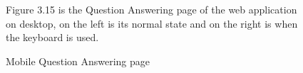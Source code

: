 \documentclass[12pt,oneside,openright,a4paper]{cpe-english-project}
\begin{document}
\begin{figure}[!h]
\begin{minipage}{.3\textwidth}
      \end{minipage}%
      \caption{Mobile Question Answering page}\label{fig:Mobile Question Answering page}
      \begin{flushleft}
        \qquad Figure 3.15 is the Question Answering page of the web application on desktop, on the left is its normal state and on the right is when the keyboard is used. \par
      \end{flushleft}
    \end{figure}
\end{document}
